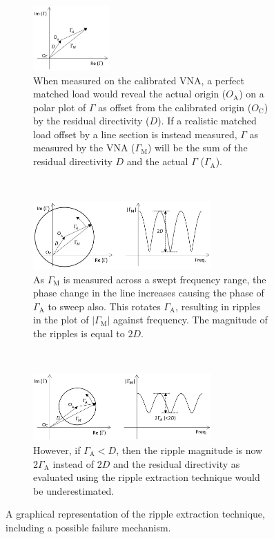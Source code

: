 \documentclass[../thesis/thesis.tex]{subfiles}
\begin{document}
\begin{refsection}
\begin{figure}
	\centering
	\begin{subfigure}{\textwidth}
		\centering
		\includegraphics[width=0.32\textwidth]{Ripple1.png}
		\caption{When measured on the calibrated VNA, a perfect matched load would reveal the actual origin ($O_\textrm{A}$) on a polar plot of $\Gamma$ as offset from the calibrated origin ($O_\textrm{C}$) by the residual directivity ($D$). If a realistic matched load offset by a line section is instead measured, $\Gamma$ as measured by the VNA ($\Gamma_\textrm{M}$) will be the sum of the residual directivity $D$ and the actual $\Gamma$ ($\Gamma_\textrm{A}$). }
	\end{subfigure}
	\\
	\begin{subfigure}{\textwidth}
		\centering
		\includegraphics[width=0.75\textwidth]{Ripple2.png}
		\caption{As $\Gamma_\textrm{M}$ is measured across a swept frequency range, the phase change in the line increases causing the phase of $\Gamma_\textrm{A}$ to sweep also. This rotates $\Gamma_\textrm{A}$, resulting in ripples in the plot of $|\Gamma_\textrm{M}|$ against frequency. The magnitude of the ripples is equal to $2D$. }
	\end{subfigure}
	\\
	\begin{subfigure}{\textwidth}
		\centering
		\includegraphics[width=0.75\textwidth]{Ripple3.png}
		\caption{However, if $\Gamma_\textrm{A} < D$, then the ripple magnitude is now $2\Gamma_\textrm{A}$ instead of $2D$ and the residual directivity as evaluated using the ripple extraction technique would be underestimated.}
	\end{subfigure}
	\caption{A graphical representation of the ripple extraction technique, including a possible failure mechanism.}
	\label{ch4_fig_ripple1}
\end{figure}


\end{refsection}
\end{document}
